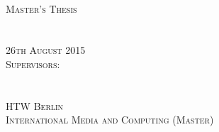 
\thispagestyle{empty}


\begin{center}

\vspace*{2cm}
\Large
\textsc{\thesistitle}\\

\vspace{3cm}

\textsc{Master's Thesis\\[0.5\baselineskip]
\thesisauthor\\
\matrikelnr}\\


\vspace{2.5cm}
\textsc{26th August 2015}\\

\vspace{1cm}
\textsc{Supervisors:\\
\firstsupervisor\\
\secondsupervisor}\\

\vspace{0.5cm}
\textsc{HTW Berlin\\
International Media and Computing (Master)}

\end{center}

\addtocounter{page}{-1}